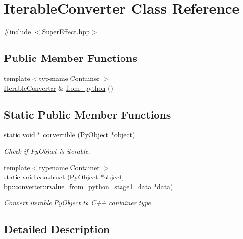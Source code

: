 \hypertarget{class_iterable_converter}{}\section{Iterable\+Converter Class Reference}
\label{class_iterable_converter}


{\ttfamily \#include $<$Super\+Effect.\+hpp$>$}

\subsection*{Public Member Functions}
\begin{DoxyCompactItemize}
\item 
{\footnotesize template$<$typename Container $>$ }\\\mbox{\hyperlink{class_iterable_converter}{Iterable\+Converter}} \& \mbox{\hyperlink{class_iterable_converter_a521a8eee4934ed7afa8bce9633a70e36}{from\+\_\+python}} ()
\end{DoxyCompactItemize}
\subsection*{Static Public Member Functions}
\begin{DoxyCompactItemize}
\item 
static void $\ast$ \mbox{\hyperlink{class_iterable_converter_a75ed48406a2b25b9020d0644eb0984c0}{convertible}} (Py\+Object $\ast$object)
\begin{DoxyCompactList}\small\item\em Check if Py\+Object is iterable. \end{DoxyCompactList}\item 
{\footnotesize template$<$typename Container $>$ }\\static void \mbox{\hyperlink{class_iterable_converter_a34fe9c6bdff8d7bdf9abf9dd59c760a6}{construct}} (Py\+Object $\ast$object, bp\+::converter\+::rvalue\+\_\+from\+\_\+python\+\_\+stage1\+\_\+data $\ast$data)
\begin{DoxyCompactList}\small\item\em Convert iterable Py\+Object to C++ container type. \end{DoxyCompactList}\end{DoxyCompactItemize}


\subsection{Detailed Description}


